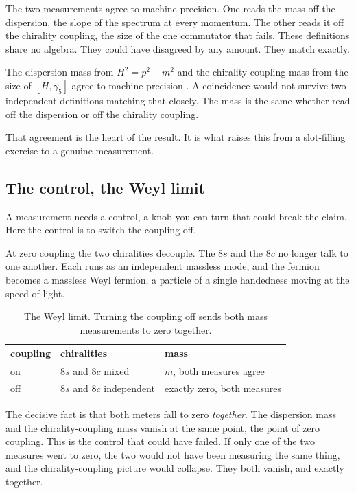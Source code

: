 The two measurements agree to machine precision. One reads the mass off the dispersion, the slope of the spectrum at every momentum. The other reads it off the chirality coupling, the size of the one commutator that fails. These definitions share no algebra. They could have disagreed by any amount. They match exactly.

\begin{result}
The dispersion mass from $H^2 = p^2 + m^2$ and the chirality-coupling mass from the size of $[H, \gamma_5]$ agree to machine precision \cite{pollard2026vibetest}. A coincidence would not survive two independent definitions matching that closely. The mass is the same whether read off the dispersion or off the chirality coupling.
\end{result}

That agreement is the heart of the result. It is what raises this from a slot-filling exercise to a genuine measurement.

\subsection{The control, the Weyl limit}

A measurement needs a control, a knob you can turn that could break the claim. Here the control is to switch the coupling off.

At zero coupling the two chiralities decouple. The $8s$ and the $8c$ no longer talk to one another. Each runs as an independent massless mode, and the fermion becomes a massless Weyl fermion, a particle of a single handedness moving at the speed of light.

\begin{table}[ht]
\centering
\begin{tabular}{@{}lll@{}}
\toprule
coupling & chiralities & mass \\
\midrule
on & $8s$ and $8c$ mixed & $m$, both measures agree \\
off & $8s$ and $8c$ independent & exactly zero, both measures \\
\bottomrule
\end{tabular}
\caption{The Weyl limit. Turning the coupling off sends both mass measurements to zero together.}
\label{tab:weyl-limit}
\end{table}

The decisive fact is that both meters fall to zero \emph{together}. The dispersion mass and the chirality-coupling mass vanish at the same point, the point of zero coupling. This is the control that could have failed. If only one of the two measures went to zero, the two would not have been measuring the same thing, and the chirality-coupling picture would collapse. They both vanish, and exactly together.

